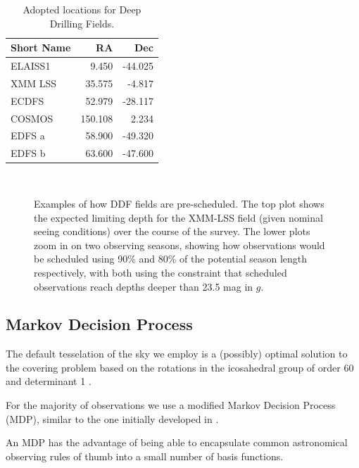 \documentclass[]{aastex631}
\begin{document}
\begin{table}
    \centering
        \begin{tabular}{lrr}
            \toprule
            Short Name & RA & Dec \\
            \midrule
            ELAISS1 & 9.450 & -44.025 \\
            XMM LSS & 35.575 & -4.817 \\
            ECDFS & 52.979 & -28.117 \\
            COSMOS & 150.108 & 2.234 \\
            EDFS a & 58.900 & -49.320 \\
            EDFS b & 63.600 & -47.600 \\
            \bottomrule
            \end{tabular}
    \caption{Adopted locations for Deep Drilling Fields.}
    \label{tab:ddf_loc}
\end{table}


\begin{figure}
    \\
    \caption{Examples of how DDF fields are pre-scheduled. The top plot shows the expected limiting depth for the XMM-LSS field (given nominal seeing conditions) over the course of the survey. The lower plots zoom in on two observing seasons, showing how observations would be scheduled using 90\% and 80\% of the potential season length respectively, with both using the constraint that scheduled observations reach depths deeper than 23.5 mag in $g$.}
    \label{fig:ddf_examples}
\end{figure}

\subsection{Markov Decision Process}

The default tesselation of the sky we employ is a (possibly) optimal solution to the covering problem based on the rotations in the icosahedral group of order 60 and determinant 1 \citep{Hardin94}.  

For the majority of observations we use a modified Markov Decision Process (MDP), similar to the one initially developed in \citet{Naghib2019}.

An MDP has the advantage of being able to encapsulate common astronomical observing rules of thumb into a small number of basis functions. 
\end{document}
